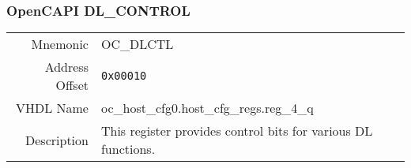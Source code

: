 \subsubsection{OpenCAPI DL\_CONTROL}
\begin{tabular}{ r | p{350px} }
  Mnemonic       & OC\_DLCTL           \\
  Address Offset & \texttt{0x00010}                         \\
  VHDL Name      & oc\_host\_cfg0.host\_cfg\_regs.reg\_4\_q \\ \hline

  Description &
  This register provides control bits for various DL functions. \\

\end{tabular}
\\
